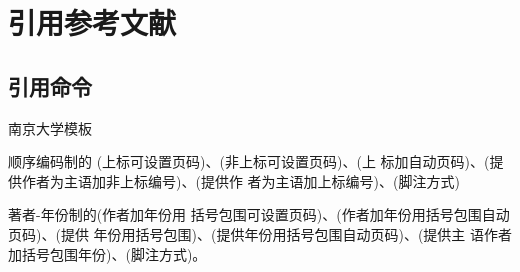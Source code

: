 \chapter{引用参考文献}
\label{chap:bibliography}

\section{引用命令}

南京大学模板\cite{njuthesis}

顺序编码制的 \cite{qiujinhengetal2010}(上标可设置页码)、\parencite{qiujinhengetal2010}(非上标可设置页码)、(上
标加自动页码)、\textcite{qiujinhengetal2010}(提供作者为主语加非上标编号)、(提供作
者为主语加上标编号)、(脚注方式)

著者-年份制的\cite{qiujinhengetal2010}(作者加年份用
括号包围可设置页码)、(作者加年份用括号包围自动页码)、(提供
年份用括号包围)、(提供年份用括号包围自动页码)、\textcite{qiujinhengetal2010}(提供主
语作者加括号包围年份)、(脚注方式)。
